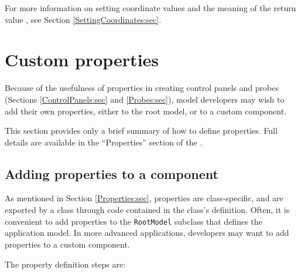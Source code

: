 For more information on setting coordinate values and the meaning
of the return value ,
see Section \ref{SettingCoordinates:sec}.

\section{Custom properties}
\label{CustomProperties:sec}

Because of the usefulness of properties in creating control panels and
probes (Sections \ref{ControlPanels:sec} and
\ref{Probes:sec}), model developers may wish to add their own
properties, either to the root model, or to a custom component.

This section provides only a brief summary of how to define
properties. Full details are available in the ``Properties'' section of
the .

\subsection{Adding properties to a component}

As mentioned in Section \ref{Properties:sec}, properties are
class-specific, and are exported by a class through code contained in
the class's definition.  Often, it is convenient to add properties to
the {\tt RootModel} subclass that defines the application model. In
more advanced applications, developers may want to add properties to a
custom component.

The property definition steps are:


